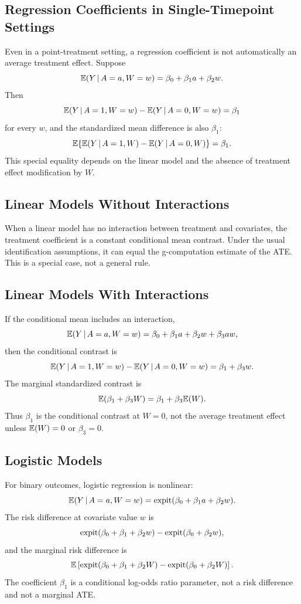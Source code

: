 \label{lec:8-5}

\subsection{Regression Coefficients in Single-Timepoint Settings}

Even in a point-treatment setting, a regression coefficient is not automatically
an average treatment effect. Suppose
\[
  \mathbb{E}(Y\,\vert\, A=a,W=w)=\beta_0+\beta_1 a+\beta_2 w.
\]
Then
\[
  \mathbb{E}(Y\,\vert\, A=1,W=w)-\mathbb{E}(Y\,\vert\, A=0,W=w)=\beta_1
\]
for every $w$, and the standardized mean difference is also $\beta_1$:
\[
  \mathbb{E}\{\mathbb{E}(Y\,\vert\, A=1,W)-\mathbb{E}(Y\,\vert\, A=0,W)\}=\beta_1.
\]
This special equality depends on the linear model and the absence of treatment
effect modification by $W$.

\subsection{Linear Models Without Interactions}

When a linear model has no interaction between treatment and covariates, the
treatment coefficient is a constant conditional mean contrast. Under the usual
identification assumptions, it can equal the g-computation estimate of the ATE.
This is a special case, not a general rule.

\subsection{Linear Models With Interactions}

If the conditional mean includes an interaction,
\[
  \mathbb{E}(Y\,\vert\, A=a,W=w)=\beta_0+\beta_1a+\beta_2w+\beta_3aw,
\]
then the conditional contrast is
\[
  \mathbb{E}(Y\,\vert\, A=1,W=w)-\mathbb{E}(Y\,\vert\, A=0,W=w)=\beta_1+\beta_3w.
\]
The marginal standardized contrast is
\[
  \mathbb{E}(\beta_1+\beta_3W)=\beta_1+\beta_3\mathbb{E}(W).
\]
Thus $\beta_1$ is the conditional contrast at $W=0$, not the average treatment
effect unless $\mathbb{E}(W)=0$ or $\beta_3=0$.

\subsection{Logistic Models}

For binary outcomes, logistic regression is nonlinear:
\[
  \mathbb{E}(Y\,\vert\, A=a,W=w)=\operatorname{expit}(\beta_0+\beta_1a+\beta_2w).
\]
The risk difference at covariate value $w$ is
\[
  \operatorname{expit}(\beta_0+\beta_1+\beta_2w)-\operatorname{expit}(\beta_0+\beta_2w),
\]
and the marginal risk difference is
\[
  \mathbb{E}\left[
    \operatorname{expit}(\beta_0+\beta_1+\beta_2W)-\operatorname{expit}(\beta_0+\beta_2W)
  \right].
\]
The coefficient $\beta_1$ is a conditional log-odds ratio parameter, not a risk
difference and not a marginal ATE.

